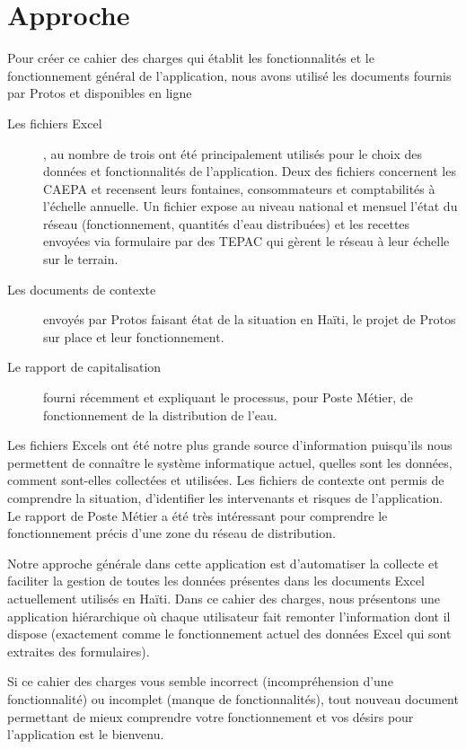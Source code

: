 \documentclass[a4paper, 11pt]{article}
\begin{document}
\section{Approche \label{sec:approach}}
  Pour créer ce cahier des charges qui établit les fonctionnalités et le fonctionnement général de l'application, nous avons utilisé les documents fournis par Protos et disponibles en ligne
  \begin{description}
    \item[Les fichiers Excel], au nombre de trois ont été principalement utilisés pour le choix des données et fonctionnalités de l'application. Deux des fichiers concernent les CAEPA et recensent leurs fontaines, consommateurs et comptabilités à l'échelle annuelle. Un fichier expose au niveau national et mensuel l'état du réseau (fonctionnement, quantités d'eau distribuées) et les recettes envoyées via formulaire par des TEPAC qui gèrent le réseau à leur échelle sur le terrain.
    \item[Les documents de contexte] envoyés par Protos faisant état de la situation en Haïti, le projet de Protos sur place et leur fonctionnement.
    \item[Le rapport de capitalisation] fourni récemment et expliquant le processus, pour Poste Métier, de fonctionnement de la distribution de l'eau.
  \end{description}
  Les fichiers Excels ont été notre plus grande source d'information puisqu'ils nous permettent de connaître le système informatique actuel, quelles sont les données, comment sont-elles collectées et utilisées.
  Les fichiers de contexte ont permis de comprendre la situation, d'identifier les intervenants et risques de l'application.
  Le rapport de Poste Métier a été très intéressant pour comprendre le fonctionnement précis d'une zone du réseau de distribution.

  Notre approche générale dans cette application est d'automatiser la collecte et faciliter la gestion de toutes les données présentes dans les documents Excel actuellement utilisés en Haïti. Dans ce cahier des charges, nous présentons une application hiérarchique où chaque utilisateur fait remonter l'information dont il dispose (exactement comme le fonctionnement actuel des données Excel qui sont extraites des formulaires).

  \begin{shaded}
    Si ce cahier des charges vous semble incorrect (incompréhension d'une fonctionnalité) ou incomplet (manque de fonctionnalités), tout nouveau document permettant de mieux comprendre votre fonctionnement et vos désirs pour l'application est le bienvenu.
  \end{shaded}
\end{document}
